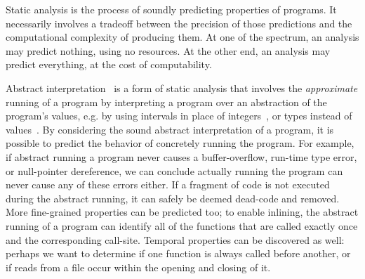 Static analysis is the process of soundly predicting properties of
programs.
%
It necessarily involves a tradeoff between the precision of those
predictions and the computational complexity of producing them.
%
At one of the spectrum, an analysis may predict nothing, using no
resources.  At the other end, an analysis may predict everything, at
the cost of computability.

Abstract interpretation~\cite{dvanhorn:Cousot:1977:AI} is a form of
static analysis that involves the \emph{approximate} running of a
program by interpreting a program over an abstraction of the program's
values, e.g. by using intervals in place of
integers~\cite{Cousot-TASE07tutorial}, or types instead of
values~\cite{dvanhorn:esop:kmf07}.
%
By considering the sound abstract interpretation of a program, it is
possible to predict the behavior of concretely running the program. 
%
For example, if abstract running a program never causes a
buffer-overflow, run-time type error, or null-pointer dereference, we
can conclude actually running the program can never cause any of these
errors either.  If a fragment of code is not executed during the
abstract running, it can safely be deemed dead-code and removed.  More
fine-grained properties can be predicted too; to enable inlining, the
abstract running of a program can identify all of the functions that
are called exactly once and the corresponding call-site.  Temporal
properties can be discovered as well: perhaps we want to determine if
one function is always called before another, or if reads from a file
occur within the opening and closing of it.








